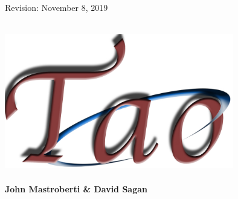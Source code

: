 \thispagestyle{empty}

\begin{flushright}
\large
Revision: November 8, 2019 \\
\end{flushright}

\vfill


{
\begin{center}
 \\
\vskip 0.1in
\includegraphics[width=10cm]{tao-logo.pdf} \\
\vskip 0.1in
 \\
\vskip 0.4in
{\huge \sf\bf John Mastroberti \& David Sagan} \\
\end{center}
}

\vfill
\break
